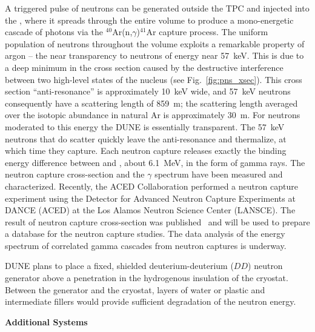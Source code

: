 A triggered pulse of neutrons can be generated outside the TPC and injected into the , where it spreads through the entire volume to produce a mono-energetic cascade of photons via the $^{40}$Ar(n,$\gamma$)$^{41}$Ar capture process. The uniform population of neutrons throughout the  volume exploits a remarkable property of argon -- the near transparency to neutrons of energy near \SI{57}{\keV}. 
This is due to a deep minimum in the cross section caused by the destructive interference between two high-level states of the  nucleus (see Fig.~\ref{fig:pns_xsec}). This cross section ``anti-resonance'' is approximately  \SI{10}{\keV} wide, and \SI{57}{keV} neutrons consequently have a scattering length of \SI{859}{m}; the scattering length averaged over the isotopic abundance in natural Ar is approximately \SI{30}{m}. 
For neutrons moderated to this energy the DUNE  is essentially transparent. The \SI{57}{keV} neutrons that do scatter quickly leave the anti-resonance and thermalize, at which time they capture. Each neutron capture releases exactly the binding energy difference between  and , about \SI{6.1}{\MeV}, in the form of gamma rays. 
The neutron capture cross-section and the $\gamma$ spectrum have been measured and characterized. Recently, the ACED Collaboration performed a neutron capture experiment using  the Detector  for Advanced  Neutron  Capture  Experiments  at DANCE (ACED)  at the  Los  Alamos  Neutron  Science  Center  (LANSCE). The result of neutron capture cross-section was published~\cite{Fischer:2019qfr} and will be used to prepare a database for the neutron capture studies. The data analysis of the energy spectrum of correlated gamma cascades from neutron captures is underway.

DUNE plans
to place a fixed, shielded deuterium-deuterium ($DD$) neutron generator  above a penetration in the hydrogenous insulation of the  cryostat. Between the generator and the cryostat, layers of water or plastic and intermediate fillers would provide sufficient degradation of the neutron energy. 

\textbf{Additional Systems}

